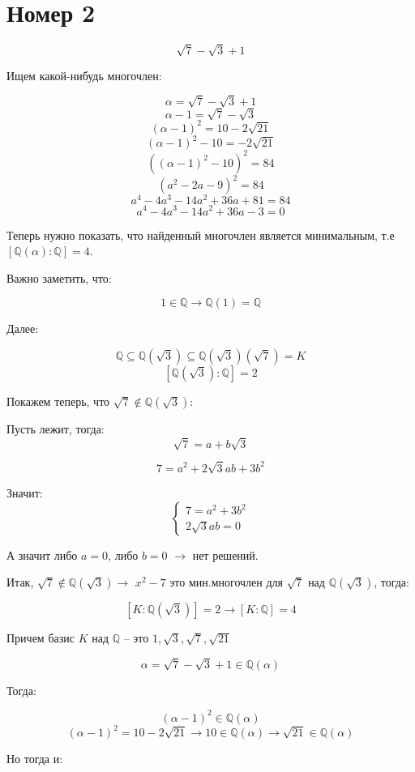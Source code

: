 \documentclass[a4paper,12pt]{article}
\begin{document}
\clearpage
\section*{Номер 2}
\[
\sqrt{7} - \sqrt{3} + 1
\]

Ищем какой-нибудь многочлен:

\[
\alpha = \sqrt{7} - \sqrt{3} + 1
\]
\[
\alpha - 1 = \sqrt{7} - \sqrt{3}
\]
\[
(\alpha - 1)^2 = 10 - 2\sqrt{21}
\]
\[
(\alpha - 1)^2 - 10 = -2\sqrt{21}
\]
\[
((\alpha - 1)^2 - 10 )^2 = 84
\]
\[
(a^2 - 2a - 9)^2 = 84
\]
\[
a^4 - 4a^3 - 14a^2 + 36a + 81 = 84
\]
\[
a^4 - 4a^3 - 14a^2 + 36a -3 = 0
\]

Теперь нужно показать, что найденный многочлен является минимальным, т.е $[\mathbb{Q}(\alpha) : \mathbb{Q}] = 4$.

Важно заметить, что:

\[
1 \in \mathbb{Q} \rightarrow \mathbb{Q}(1) = \mathbb{Q}
\]

Далее:

\[
\mathbb{Q} \subseteq \mathbb{Q}(\sqrt{3}) \subseteq \mathbb{Q}(\sqrt{3})(\sqrt{7}) = K
\]
\[
[\mathbb{Q}(\sqrt{3}) : \mathbb{Q}] = 2
\]

Покажем теперь, что $\sqrt{7} \notin \mathbb{Q}(\sqrt{3})$:

Пусть лежит, тогда:
\[
\sqrt{7} = a + b\sqrt{3}
\]

\[
7 = a^2 + 2\sqrt{3}ab + 3b^2
\]

Значит:
\[
\begin{cases}
7 = a^2 + 3b^2 \\
2\sqrt{3}ab = 0
\end{cases}
\]

А значит либо $a = 0$, либо $b = 0$ $\rightarrow$ нет решений. 

Итак, $\sqrt{7} \notin \mathbb{Q}(\sqrt{ 3}) \rightarrow$ $x^2 - 7$ это мин.многочлен для $\sqrt{7}$ над $\mathbb{Q}(\sqrt{3})$, тогда:

\[
[K : \mathbb{Q}(\sqrt{3})] = 2 \rightarrow [K : \mathbb{Q}] = 4
\]

Причем базис $K$ над $\mathbb{Q}$ -- это $1, \sqrt{3}, \sqrt{7}, \sqrt{21}$

\[
\alpha = \sqrt{7} - \sqrt{3} + 1 \in \mathbb{Q}(\alpha)
\]

Тогда:

\[
(\alpha - 1)^2\in \mathbb{Q}(\alpha) 
\]
\[
(\alpha - 1)^2 = 10 - 2\sqrt{21} \rightarrow 10 \in \mathbb{Q}(\alpha) \rightarrow \sqrt{21} \in \mathbb{Q}(\alpha)
\]

Но тогда и:
\end{document}
